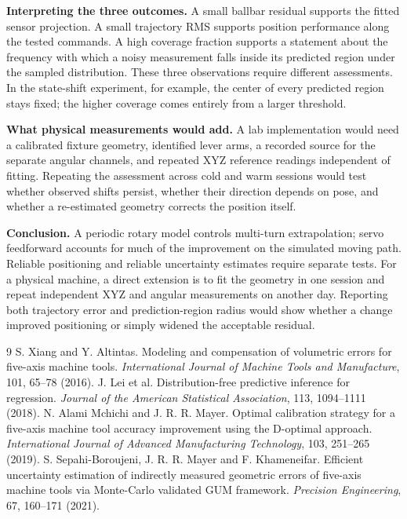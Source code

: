 \documentclass[11pt,a4paper]{article}
\begin{document}
\textbf{Interpreting the three outcomes.} A small ballbar residual supports the fitted sensor projection. A small trajectory RMS supports position performance along the tested commands. A high coverage fraction supports a statement about the frequency with which a noisy measurement falls inside its predicted region under the sampled distribution. These three observations require different assessments. In the state-shift experiment, for example, the center of every predicted region stays fixed; the higher coverage comes entirely from a larger threshold.
 
\textbf{What physical measurements would add.} A lab implementation would need a calibrated fixture geometry, identified lever arms, a recorded source for the separate angular channels, and repeated XYZ reference readings independent of fitting. Repeating the assessment across cold and warm sessions would test whether observed shifts persist, whether their direction depends on pose, and whether a re-estimated geometry corrects the position itself.
 
\textbf{Conclusion.}
A periodic rotary model controls multi-turn extrapolation; servo feedforward accounts for much of the improvement on the simulated moving path. Reliable positioning and reliable uncertainty estimates require separate tests. For a physical machine, a direct extension is to fit the geometry in one session and repeat independent XYZ and angular measurements on another day. Reporting both trajectory error and prediction-region radius would show whether a change improved positioning or simply widened the acceptable residual.
\begingroup\small
\begin{thebibliography}{9}\setlength{\itemsep}{0pt}
 S. Xiang and Y. Altintas. Modeling and compensation of volumetric errors for five-axis machine tools. \emph{International Journal of Machine Tools and Manufacture}, 101, 65--78 (2016).
 J. Lei et al. Distribution-free predictive inference for regression. \emph{Journal of the American Statistical Association}, 113, 1094--1111 (2018).
 N. Alami Mchichi and J. R. R. Mayer. Optimal calibration strategy for a five-axis machine tool accuracy improvement using the D-optimal approach. \emph{International Journal of Advanced Manufacturing Technology}, 103, 251--265 (2019).
 S. Sepahi-Boroujeni, J. R. R. Mayer and F. Khameneifar. Efficient uncertainty estimation of indirectly measured geometric errors of five-axis machine tools via Monte-Carlo validated GUM framework. \emph{Precision Engineering}, 67, 160--171 (2021).
\end{thebibliography}\endgroup
\appendix
\end{document}
